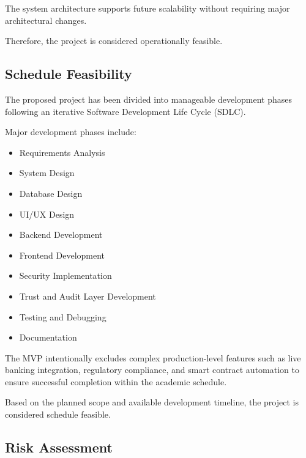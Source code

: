 The system architecture supports future scalability without requiring major architectural changes.

Therefore, the project is considered operationally feasible.


\subsection{Schedule Feasibility}

The proposed project has been divided into manageable development phases following an iterative Software Development Life Cycle (SDLC).

Major development phases include:

\begin{itemize}

\item Requirements Analysis

\item System Design

\item Database Design

\item UI/UX Design

\item Backend Development

\item Frontend Development

\item Security Implementation

\item Trust and Audit Layer Development

\item Testing and Debugging

\item Documentation

\end{itemize}

The MVP intentionally excludes complex production-level features such as live banking integration, regulatory compliance, and smart contract automation to ensure successful completion within the academic schedule.

Based on the planned scope and available development timeline, the project is considered schedule feasible.


\subsection{Risk Assessment}

